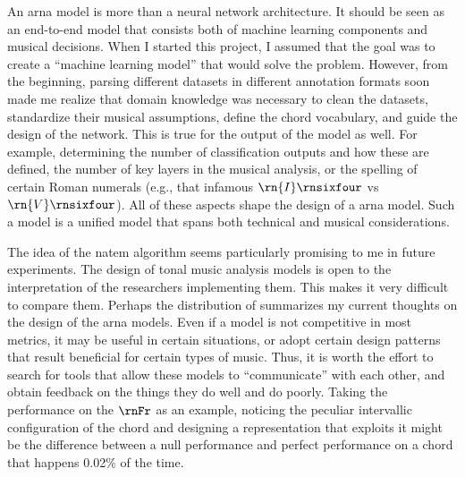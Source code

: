 
An \gls{arna} model is more than a neural network
architecture. It should be seen as an end-to-end model that
consists both of machine learning components and musical
decisions. When I started this project, I assumed that the
goal was to create a ``machine learning model'' that would
solve the problem. However, from the beginning, parsing
different datasets in different annotation formats soon made
me realize that domain knowledge was necessary to clean the
datasets, standardize their musical assumptions, define the
chord vocabulary, and guide the design of the network. This
is true for the output of the model as well. For example,
determining the number of classification outputs and how
these are defined, the number of key layers in the musical
analysis, or the spelling of certain Roman numerals (e.g.,
that infamous $\rn{I}\rnsixfour$ vs $\rn{V}\rnsixfour$). All
of these aspects shape the design of a \gls{arna} model.
Such a model is a unified model that spans both technical
and musical considerations.

The idea of the \gls{natem} algorithm seems particularly
promising to me in future experiments. The design of tonal
music analysis models is open to the interpretation of the
researchers implementing them. This makes it very difficult
to compare them. Perhaps the distribution of
 summarizes my current thoughts on the
design of the \gls{arna} models. Even if a model is not
competitive in most metrics, it may be useful in certain
situations, or adopt certain design patterns that result
beneficial for certain types of music. Thus, it is worth the
effort to search for tools that allow these models to
``communicate'' with each other, and obtain feedback on the
things they do well and do poorly. Taking the performance on
the $\rnFr$ as an example, noticing the peculiar intervallic
configuration of the chord and designing a representation
that exploits it might be the difference between a null
performance and perfect performance on a chord that happens
0.02\% of the time.



